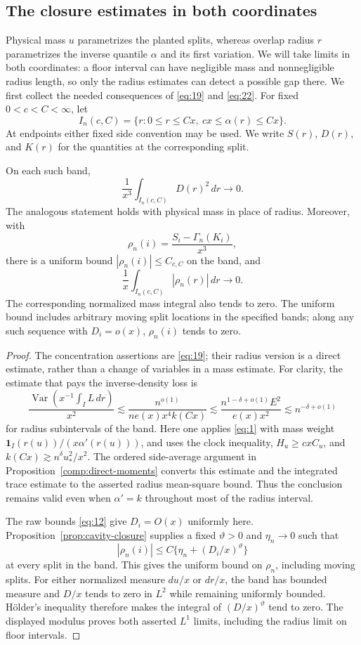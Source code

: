 \subsection{The closure estimates in both coordinates}

Physical mass $u$ parametrizes the planted splits, whereas overlap
radius $r$ parametrizes the inverse quantile $\alpha$ and its first
variation. We will take limits in both coordinates: a floor interval
can have negligible mass and nonnegligible radius length, so only the
radius estimates can detect a possible gap there. We first collect the
needed consequences of \eqref{eq:19} and \eqref{eq:22}.
For fixed $0<c<C<\infty$, let
\[
 I_n(c,C)=\{r:0\le r\le Cx,\ cx\le\alpha(r)\le Cx\}.
\]
At endpoints either fixed side convention may be used. We write $S(r)$,
$D(r)$, and $K(r)$ for the quantities at the corresponding split.

\begin{lemma}\label{prof:coordinate-closure}
On each such band,
\[
 \frac1{x^3}\int_{I_n(c,C)}D(r)^2\,dr\longrightarrow0.
\]
The analogous statement holds with physical mass in place of radius.
Moreover, with
\[
 \rho_n(i)=\frac{S_i-\Gamma_n(K_i)}{x^3},
\]
there is a uniform bound $|\rho_n(i)|\le C_{c,C}$ on the band, and
\[
 \frac1x\int_{I_n(c,C)}|\rho_n(r)|\,dr\longrightarrow0.
\]
The corresponding normalized mass integral also tends to zero.
The uniform bound includes arbitrary moving split locations in the
specified bands; along any such sequence with $D_i=o(x)$,
$\rho_n(i)$ tends to zero.
\end{lemma}

\begin{proof}
The concentration assertions are \eqref{eq:19}; their radius version is
a direct estimate, rather than a change of variables in a mass estimate.
For clarity, the estimate that pays the inverse-density loss is
\[
 \frac{\operatorname{Var}(x^{-1}\int_I L\,dr)}{x^2}
 \lesssim\frac{n^{o(1)}}{ne(x)x^4k(Cx)}
 \lesssim\frac{n^{1-\delta+o(1)}E^2}{e(x)x^2}
 \lesssim n^{-\delta+o(1)}
\]
for radius subintervals of the band. Here one applies \eqref{eq:1} with
mass weight $\mathbf1_I(r(u))/(x\alpha'(r(u)))$, and uses the clock
inequality, $H_u\ge cxC_u$, and
$k(Cx)\gtrsim n^\delta u_*^2/x^2$. The ordered side-average argument
in Proposition~\ref{comp:direct-moments} converts this estimate and the
integrated trace estimate to the asserted radius mean-square bound.
Thus the conclusion remains valid even when $\alpha'=k$ throughout
most of the radius interval.

The raw bounds \eqref{eq:12} give $D_i=O(x)$ uniformly here.
Proposition~\ref{prop:cavity-closure} supplies a fixed $\vartheta>0$
and $\eta_n\to0$ such that
\[
 |\rho_n(i)|\le C\{\eta_n+(D_i/x)^\vartheta\}
\]
at every split in the band. This gives the uniform bound on $\rho_n$,
including moving splits. For either normalized measure $du/x$ or
$dr/x$, the band has bounded measure and $D/x$ tends to zero in
$L^2$ while remaining uniformly bounded. H\"older's inequality
therefore makes the integral of $(D/x)^\vartheta$ tend to zero.
The displayed modulus proves both asserted $L^1$ limits, including
the radius limit on floor intervals.
\end{proof}

